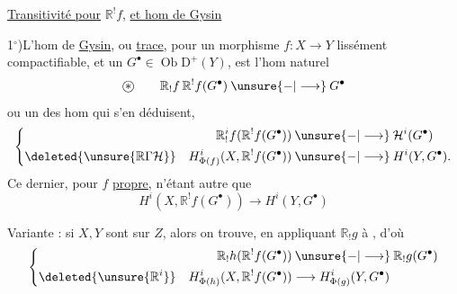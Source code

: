 \uline{Transitivité pour} $\mathbb{R}^!f$, \uline{et hom de Gysin}

1$^\circ$)\quad L'hom de \uline{Gysin}, ou \uline{trace}, pour un
morphisme $f:X\longrightarrow Y$ lissément compactifiable,
 et un $G^\bullet\in\operatorname{Ob}\mathrm D^+(Y)$, est l'hom
naturel
\[
\text{\textcircled{$*$}}\qquad
\mathbb{R}_!f\,\mathbb{R}^!f(G^\bullet)\mathbin{\unsure{-|\longrightarrow}}G^\bullet
\]
ou un des hom qui s'en déduisent,
\[
\left\{
\begin{aligned}
\mathbb{R}_!^if(\mathbb{R}^!f(G^\bullet))&\mathbin{\unsure{-|\longrightarrow}}\mathcal H^i(G^\bullet)\\
\deleted{\unsure{\mathbb{R}\Gamma\mathcal H}}\quad
H^i_{\Phi(f)}(X,\mathbb{R}^!f(G^\bullet))&\mathbin{\unsure{-|\longrightarrow}}H^i(Y,G^\bullet).
\end{aligned}
\right.
\]
Ce dernier, pour $f$ \uline{propre}, n'étant autre que
\[
H^i(X,\mathbb{R}^!f(G^\bullet))\longrightarrow H^i(Y,G^\bullet)
\]

Variante : si $X,Y$ sont sur $Z$, alors on
trouve, en appliquant $\mathbb{R}_!g$ à \unsure{\textcircled{$*$}},
d'où
\[
\left\{
\begin{aligned}
\mathbb{R}_!h(\mathbb{R}^!f(G^\bullet))&\mathbin{\unsure{-|\longrightarrow}}\mathbb{R}_!g(G^\bullet)\\
\deleted{\unsure{\mathbb{R}^i}}\quad
H^i_{\Phi(h)}(X,\mathbb{R}^!f(G^\bullet))&\longrightarrow
 H^i_{\Phi(g)}(Y,G^\bullet)
\end{aligned}
\right.
\]
